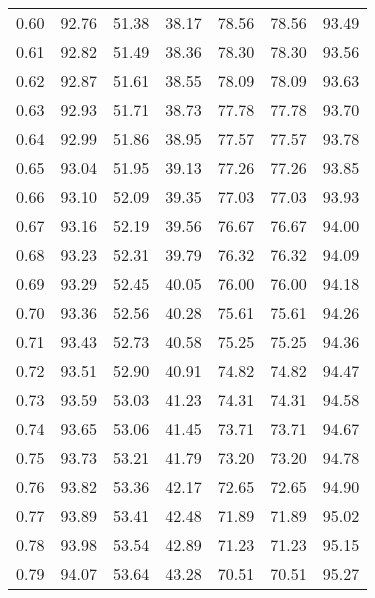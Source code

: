 \begin{tabular}{|c|c|c|c|c|c|c|}
      0.60 &     92.76 &     51.38 &      38.17 &   78.56 &      78.56 &         93.49 \\
      0.61 &     92.82 &     51.49 &      38.36 &   78.30 &      78.30 &         93.56 \\
      0.62 &     92.87 &     51.61 &      38.55 &   78.09 &      78.09 &         93.63 \\
      0.63 &     92.93 &     51.71 &      38.73 &   77.78 &      77.78 &         93.70 \\
      0.64 &     92.99 &     51.86 &      38.95 &   77.57 &      77.57 &         93.78 \\
      0.65 &     93.04 &     51.95 &      39.13 &   77.26 &      77.26 &         93.85 \\
      0.66 &     93.10 &     52.09 &      39.35 &   77.03 &      77.03 &         93.93 \\
      0.67 &     93.16 &     52.19 &      39.56 &   76.67 &      76.67 &         94.00 \\
      0.68 &     93.23 &     52.31 &      39.79 &   76.32 &      76.32 &         94.09 \\
      0.69 &     93.29 &     52.45 &      40.05 &   76.00 &      76.00 &         94.18 \\
      0.70 &     93.36 &     52.56 &      40.28 &   75.61 &      75.61 &         94.26 \\
      0.71 &     93.43 &     52.73 &      40.58 &   75.25 &      75.25 &         94.36 \\
      0.72 &     93.51 &     52.90 &      40.91 &   74.82 &      74.82 &         94.47 \\
      0.73 &     93.59 &     53.03 &      41.23 &   74.31 &      74.31 &         94.58 \\
      0.74 &     93.65 &     53.06 &      41.45 &   73.71 &      73.71 &         94.67 \\
      0.75 &     93.73 &     53.21 &      41.79 &   73.20 &      73.20 &         94.78 \\
      0.76 &     93.82 &     53.36 &      42.17 &   72.65 &      72.65 &         94.90 \\
      0.77 &     93.89 &     53.41 &      42.48 &   71.89 &      71.89 &         95.02 \\
      0.78 &     93.98 &     53.54 &      42.89 &   71.23 &      71.23 &         95.15 \\
      0.79 &     94.07 &     53.64 &      43.28 &   70.51 &      70.51 &         95.27 \\

\end{tabular}
